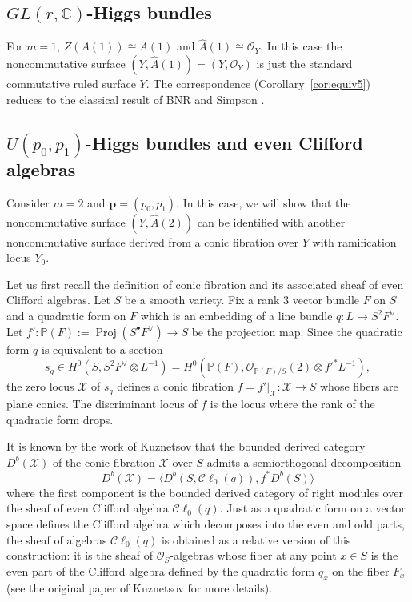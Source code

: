 \documentclass[11pt]{amsart}
\theoremstyle{plain}
\theoremstyle{definition}
\theoremstyle{remark}
\def\C{\mathbb{C}}
\def\P{\mathbb{P}}
\def\O{\mathcal{O}}
\def\m{\mu}
\def\m{\mathcal}
\def\wA{\widehat{A}}
\begin{document}
\subsection{$GL(r, \C)$-Higgs bundles}
For $m=1$, $Z(A(1))\cong A(1)$ and $\wA(1) \cong \O_Y$. In this case the noncommutative surface $(Y, \wA(1))= (Y, \O_Y)$ is just the standard commutative ruled surface $Y$. The correspondence (Corollary~\ref{cor:equiv5}) reduces to the classical result of BNR \cite{bnr} and Simpson \cite{simpsonmoduli}. 

\subsection{$U(p_0,p_1)$-Higgs bundles and even Clifford algebras}\label{sec:clifford}
    Consider $m=2$ and $\bm{p}= (p_0,p_1)$. In this case, we will show that the noncommutative surface $(Y, \wA(2))$ can be identified with another noncommutative surface derived from a conic fibration over $Y$ with ramification locus $Y_0$. 

    Let us first recall the definition of conic fibration and its associated sheaf of even Clifford algebras. Let $S$ be a smooth variety. 
    Fix a rank $3$ vector bundle $F$ on $S$ and a  quadratic form on $F$ which is an embedding of a line bundle $q: L \to S^2F^{\vee}$. Let $f':\P(F):= \operatorname{Proj}(S^\bullet F^{\vee})\to S$ be the projection map. Since the quadratic form $q$ is equivalent to a section 
    \[s_q\in H^0(S, S^2 F^{\vee}\otimes L^{-1}) = H^0(\P(F), \O_{\P(F)/S}(2)\otimes f'^*L^{-1}),\]
    the zero locus $\m X$ of $s_q$ defines a conic fibration $f=f'|_{\m X}: \m X\to S$ whose fibers are plane conics. The discriminant locus of $f$ is the locus where the rank of the quadratic form drops. 
    
    It is known by the work of Kuznetsov \cite{kuznetsov-quadric} that the bounded derived category $D^b(\m X)$ of the conic fibration $\m X$ over $S$ admits a semiorthogonal decomposition 
    \[ D^b(\m X) = \langle D^b(S, \mathcal{C}\ell_0(q)), f^*D^b(S) \rangle\]
    where the first component is the bounded derived category of right modules over the sheaf of even Clifford algebra $\mathcal{C}\ell_0(q)$. Just as a quadratic form on a vector space defines the Clifford algebra which decomposes into the even and odd parts, the sheaf of algebras $\mathcal{C}\ell_0(q)$ is obtained as a relative version of this construction: it is the sheaf of $\O_S$-algebras whose fiber at any point $x\in S$ is the even part of the Clifford algebra defined by the quadratic form $q_x$ on the fiber $F_x$ (see the original paper of Kuznetsov \cite{kuznetsov-quadric} for more details). 
\end{document}
